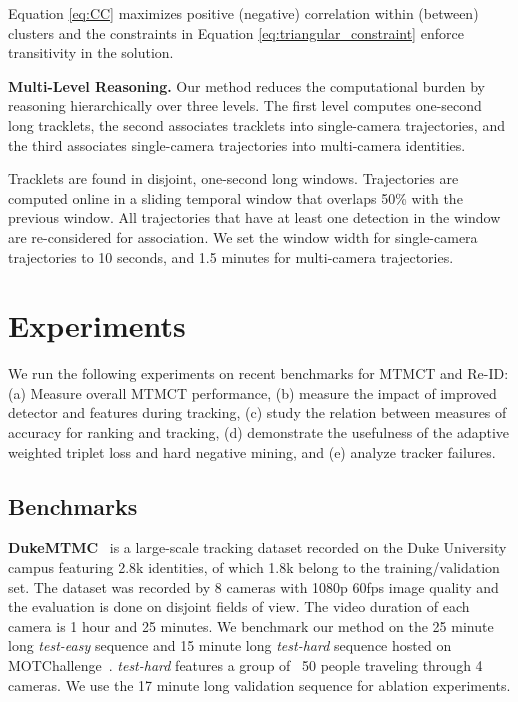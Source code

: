 \documentclass[10pt,twocolumn,letterpaper]{article}
\begin{document}
Equation \ref{eq:CC} maximizes positive (negative) correlation within (between) clusters and the constraints in Equation \ref{eq:triangular_constraint} enforce transitivity in the solution.

\noindent\textbf{Multi-Level Reasoning.} Our method reduces the computational burden by reasoning hierarchically over three levels. The first level computes one-second long tracklets, the second associates tracklets into single-camera trajectories, and the third associates single-camera trajectories into multi-camera identities.  

Tracklets are found in disjoint, one-second long windows. Trajectories are computed online in a sliding temporal window that overlaps 50\% with the previous window. All trajectories that have at least one detection in the window are re-considered for association. We set the window width for single-camera trajectories to 10 seconds, and 1.5 minutes for multi-camera trajectories.



\section{Experiments}

We run the following experiments on recent benchmarks for MTMCT and Re-ID: (a) Measure overall MTMCT performance, (b) measure the impact of improved detector and features during tracking, (c) study the relation between measures of accuracy for ranking and tracking, (d) demonstrate the usefulness of the adaptive weighted triplet loss and hard negative mining, and (e) analyze tracker failures. 

\subsection{Benchmarks}

\noindent\textbf{DukeMTMC}~\cite{ristani2016performance} is a large-scale tracking dataset recorded on the Duke University campus featuring 2.8k identities, of which 1.8k belong to the training/validation set. The dataset was recorded by 8 cameras with 1080p 60fps image quality and the evaluation is done on disjoint fields of view. The video duration of each camera is 1 hour and 25 minutes. We benchmark our method on the 25 minute long \textit{test-easy} sequence and 15 minute long \textit{test-hard} sequence hosted on MOTChallenge~\cite{MOTChallenge2015}. \textit{test-hard} features a group of ~50 people traveling through 4 cameras. We use the 17 minute long validation sequence for ablation experiments.
\end{document}
